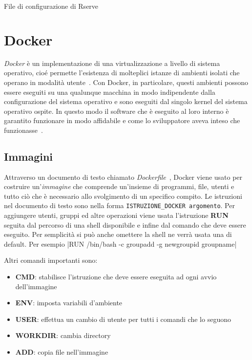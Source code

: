 \documentclass[10pt,titlepage,twoside,a4paper]{report}
\newenvironment{code}{\singlespacing\captionsetup{type=listing}}{}
\begin{document}
\begin{code}
    \caption{File di configurazione di Rserve}
    \label{lst:rservconf}
\end{code}


    \section{Docker}
\emph{Docker} è un implementazione di una virtualizzazione a 
livello di sistema operativo, cioé permette l'esistenza di molteplici istanze 
di ambienti isolati che operano in modalità 
utente~\cite{operatingSystemLevelVirtualization}. Con Docker, in particolare, 
questi ambienti possono essere eseguiti su una qualunque macchina in modo 
indipendente dalla configurazione del sistema operativo e sono eseguiti dal 
singolo kernel del sistema operativo ospite. In questo modo il software che è 
eseguito al loro interno è garantito funzionare in modo affidabile e come lo 
sviluppatore aveva inteso che funzionasse~\cite{docker}.

        \subsection{Immagini}
Attraverso un documento di testo chiamato 
\emph{Dockerfile}~\cite{DockerfileReference}, Docker viene 
usato per costruire un'\emph{immagine} che comprende un'insieme di 
programmi, file, utenti e tutto ciò che è necessario allo svolgimento di
un specifico compito. Le istruzioni nel documento di testo sono nella forma
\texttt{ISTRUZIONE_DOCKER argomento}. Per aggiungere utenti, 
gruppi ed altre operazioni viene usata l'istruzione \textbf{RUN} seguita dal 
percorso di una shell disponibile e infine dal comando che deve essere eseguito. Per 
semplicità si può anche omettere la shell ne verrà usata una di default. Per 
esempio
|RUN /bin/bash -c groupadd -g newgroupid groupname|

Altri comandi importanti sono:
\begin{itemize}
    \item \textbf{CMD}: stabilisce l'istruzione che deve essere 
eseguita ad ogni avvio dell'immagine
    \item \textbf{ENV}: imposta variabili d'ambiente
    \item \textbf{USER}: effettua un cambio di utente per tutti i comandi che lo seguono
    \item \textbf{WORKDIR}: cambia directory
    \item \textbf{ADD}: copia file nell'immagine
\end{itemize}
\end{document}

